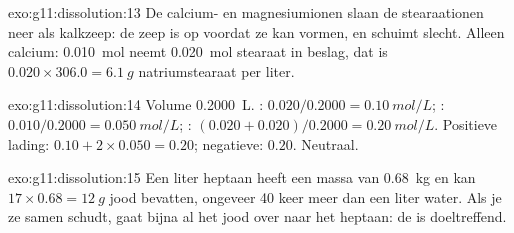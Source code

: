 \begin{solution}{exo:g11:dissolution:13}
De calcium- en magnesiumionen slaan de stearaationen neer als kalkzeep:
de zeep is op voordat ze  kan vormen, en schuimt slecht. Alleen
calcium: \qty{0.010}{mol}  neemt \qty{0.020}{mol} stearaat in
beslag, dat is $0.020 \times 306.0 =
\qty{6.1}{g}$ natriumstearaat per liter.
\end{solution}

\begin{solution}{exo:g11:dissolution:14}
Volume \qty{0.2000}{L}. : $0.020 / 0.2000 = \qty{0.10}{mol/L}$;
: $0.010 / 0.2000 = \qty{0.050}{mol/L}$; :
$(0.020 + 0.020) / 0.2000 = \qty{0.20}{mol/L}$. Positieve lading:
$0.10 + 2 \times 0.050 = 0.20$; negatieve: $0.20$. Neutraal.
\end{solution}

\begin{solution}{exo:g11:dissolution:15}
Een liter heptaan heeft een massa van \qty{0.68}{kg} en kan
$17 \times 0.68 = \qty{12}{g}$ jood bevatten, ongeveer 40 keer meer dan
een liter water. Als je ze samen schudt, gaat bijna al het jood over naar
het heptaan: de  is doeltreffend.
\end{solution}

